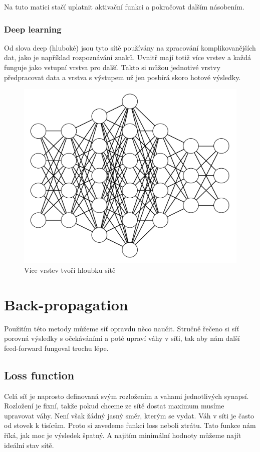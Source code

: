 \documentclass[12pt,a4paper]{report}
\begin{document}
		Na tuto matici stačí uplatnit aktivační funkci a pokračovat dalším násobením.
		
		\subsection{Deep learning}
		Od slova deep (hluboké) jsou tyto sítě používány na zpracování komplikovanějších dat, jako je například rozpoznávání znaků. Uvnitř mají totiž více vrstev a každá funguje jako vstupní vrstva pro další. Takto si můžou jednotivé vrstvy předpracovat data a vrstva s výstupem už jen posbírá skoro hotové výsledky.
		\begin{figure}[h]
			\centering
			\includegraphics[width=15cm]{nn4-4-5-6-4-3-3}
			\caption{Více vrstev tvoří hloubku sítě}
		\end{figure}
\chapter{Back-propagation}
Použitím této metody můžeme síť opravdu něco naučit. Stručně řečeno si síť porovná výsledky s očekáváními a poté upraví váhy v síťi, tak aby nám další feed-forward fungoval trochu lépe.
	\section{Loss function}
	Celá síť je naprosto definovaná svým rozložením a vahami jednotlivých synapsí. Rozložení je fixní, takže pokud chceme ze sítě dostat maximum musíme upravovat váhy. Není však žádný jasný směr, kterým se vydat. Váh v síti je často od stovek k tisícům. Proto si zavedeme funkci loss neboli ztrátu. Tato funkce nám říká, jak moc je výsledek špatný. A najitím minimální hodnoty můžeme najít ideální stav sítě.
\end{document}
